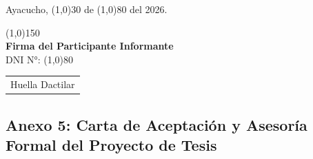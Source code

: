 \noindent Ayacucho, \line(1,0){30} de \line(1,0){80} del 2026.\\[1.2cm]
\begin{center}
\begin{minipage}{0.45\textwidth}
    \centering
    \line(1,0){150}\\
    \textbf{Firma del Participante Informante}\\
    DNI N°: \line(1,0){80}
\end{minipage}
\hfill
\begin{minipage}{0.45\textwidth}
    \centering
    \begin{tabular}{|c|}
        \hline
        \rule{0pt}{2.5cm}\parbox[b]{2.5cm}{\centering \scriptsize Huella Dactilar} \\
        \hline
    \end{tabular}
\end{minipage}
\end{center}

\vspace{0.5cm}

\subsection*{Anexo 5: Carta de Aceptación y Asesoría Formal del Proyecto de Tesis}
\label{anx:5_carta}

